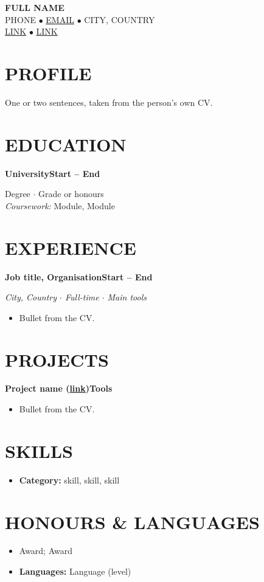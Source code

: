 \documentclass[10pt, a4paper]{article}
\newcommand{\entry}[2]{\vspace{5pt}\textbf{#1}\hfill\textbf{#2}\par}
\newcommand{\sub}[1]{\textit{#1}\par}
\begin{document}

\begin{center}
    {\huge \textbf{FULL NAME}} \\[3pt]
    \small PHONE $\bullet$ \href{mailto:EMAIL}{EMAIL} $\bullet$ CITY, COUNTRY \\
    \small \href{https://LINK}{LINK} $\bullet$ \href{https://LINK}{LINK}
\end{center}

\section*{PROFILE}
One or two sentences, taken from the person's own CV.

\section*{EDUCATION}
\entry{University}{Start -- End}
Degree $\cdot$ Grade or honours \\
\textit{Coursework:} Module, Module

\section*{EXPERIENCE}
\entry{Job title, Organisation}{Start -- End}
\sub{City, Country $\cdot$ Full-time $\cdot$ Main tools}
\begin{itemize}
    \item Bullet from the CV.
\end{itemize}

\section*{PROJECTS}
\entry{Project name (\href{https://LINK}{link})}{Tools}
\begin{itemize}
    \item Bullet from the CV.
\end{itemize}

\section*{SKILLS}
\begin{itemize}
    \item \textbf{Category:} skill, skill, skill
\end{itemize}

\section*{HONOURS \& LANGUAGES}
\begin{itemize}
    \item Award; Award
    \item \textbf{Languages:} Language (level)
\end{itemize}
\end{document}
